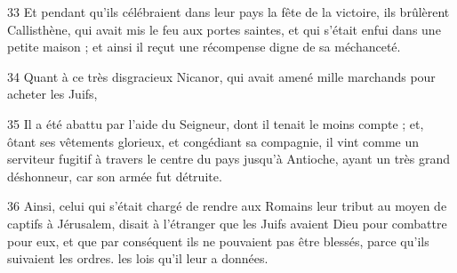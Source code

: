 \par 33 Et pendant qu'ils célébraient dans leur pays la fête de la victoire, ils brûlèrent Callisthène, qui avait mis le feu aux portes saintes, et qui s'était enfui dans une petite maison ; et ainsi il reçut une récompense digne de sa méchanceté.
\par 34 Quant à ce très disgracieux Nicanor, qui avait amené mille marchands pour acheter les Juifs,
\par 35 Il a été abattu par l'aide du Seigneur, dont il tenait le moins compte ; et, ôtant ses vêtements glorieux, et congédiant sa compagnie, il vint comme un serviteur fugitif à travers le centre du pays jusqu'à Antioche, ayant un très grand déshonneur, car son armée fut détruite.
\par 36 Ainsi, celui qui s'était chargé de rendre aux Romains leur tribut au moyen de captifs à Jérusalem, disait à l'étranger que les Juifs avaient Dieu pour combattre pour eux, et que par conséquent ils ne pouvaient pas être blessés, parce qu'ils suivaient les ordres. les lois qu'il leur a données.


